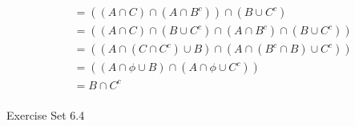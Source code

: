 \documentclass[12pt,letterpaper, onecolumn]{exam}
\begin{document}
\begin{questions}
\begin{solution}
\begin{align*}
			&=((A\cap C)\cap(A\cap B^c))\cap (B \cup C^c)\tag{By the universal bound and identity laws}\\
			&=((A\cap C)\cap(B\cup C^c)\cap(A\cap B^c)\cap(B\cup C^c))\tag{By the distributive laws}\\
			&=((A\cap (C\cap C^c)\cup B)\cap(A\cap (B^c\cap B)\cup C^c))\tag{By the associative and commutative laws}\\
			&=((A\cap \phi\cup B)\cap(A\cap\phi\cup C^c))\tag{By the complement laws}\\
			&=B\cap C^c\tag{By the universal bound and identity laws}\\
		\end{align*}
	\end{solution}
\end{questions}

	\centerline{Exercise Set 6.4}
\end{document}

